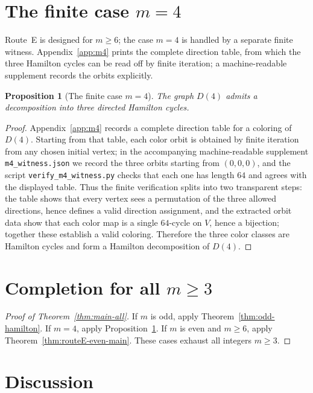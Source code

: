 \documentclass[11pt]{article}
\newtheorem{proposition}{Proposition}
\begin{document}
\section{The finite case $m=4$}\label{sec:m4}

Route~E is designed for $m\ge 6$; the case $m=4$ is handled by a separate finite witness.
Appendix~\ref{app:m4} prints the complete direction table, from which the three Hamilton cycles can be read off by finite iteration; a machine-readable supplement records the orbits explicitly.

\begin{proposition}[The finite case $m=4$]\label{prop:m4-main}
The graph $D(4)$ admits a decomposition into three directed Hamilton cycles.
\end{proposition}

\begin{proof}
Appendix~\ref{app:m4} records a complete direction table for a coloring of $D(4)$.
Starting from that table, each color orbit is obtained by finite iteration from any chosen initial vertex; in the accompanying machine-readable supplement \texttt{m4\_witness.json} we record the three orbits starting from $(0,0,0)$, and the script \texttt{verify\_m4\_witness.py} checks that each one has length $64$ and agrees with the displayed table.
Thus the finite verification splits into two transparent steps: the table shows that every vertex sees a permutation of the three allowed directions, hence defines a valid direction assignment, and the extracted orbit data show that each color map is a single $64$-cycle on $V$, hence a bijection; together these establish a valid coloring.
Therefore the three color classes are Hamilton cycles and form a Hamilton decomposition of $D(4)$.
\end{proof}


\section{Completion for all $m\ge 3$}\label{sec:completion}

\begin{proof}[Proof of Theorem~\ref{thm:main-all}]
If $m$ is odd, apply Theorem~\ref{thm:odd-hamilton}.
If $m=4$, apply Proposition~\ref{prop:m4-main}.
If $m$ is even and $m\ge 6$, apply Theorem~\ref{thm:routeE-even-main}.
These cases exhaust all integers $m\ge 3$.
\end{proof}

\section{Discussion}\label{sec:discussion}
\end{document}
